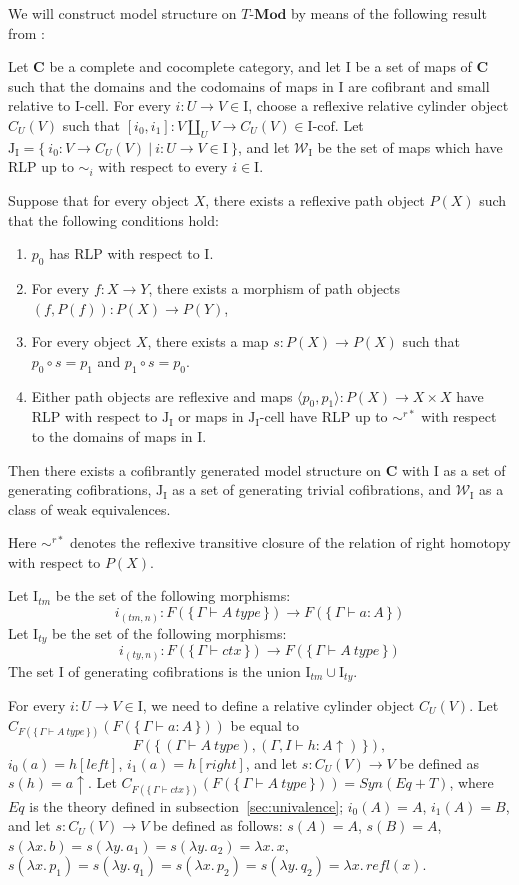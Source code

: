\documentclass[reqno]{amsart}
\theoremstyle{definition}
\theoremstyle{remark}
\newcommand{\cat}[1]{\mathbf{#1}}
\newcommand{\C}{\cat{C}}
\newcommand{\Mod}[1]{#1\text{-}\cat{Mod}}
\newcommand{\we}{\mathcal{W}}
\newcommand{\I}{\mathrm{I}}
\newcommand{\J}{\mathrm{J}}
\newcommand{\class}[2]{#1\text{-}\mathrm{#2}}
\newcommand{\Icell}[1][\I]{\class{#1}{cell}}
\newcommand{\Icof}[1][\I]{\class{#1}{cof}}
\newcommand{\Jcell}[1][]{\Icell[\J#1]}
\newcommand{\cyli}{i}
\numberwithin{figure}{section}
\begin{document}
We will construct model structure on $\Mod{T}$ by means of the following result from \cite{f-model-structures}:
\begin{thm}
Let $\C$ be a complete and cocomplete category, and let $\I$ be a set of maps of $\C$
such that the domains and the codomains of maps in $\I$ are cofibrant and small relative to $\Icell$.
For every $i : U \to V \in \I$, choose a reflexive relative cylinder object $C_U(V)$
such that $[\cyli_0,\cyli_1] : V \amalg_U V \to C_U(V) \in \Icof$.
Let $\J_\I = \{\ \cyli_0 : V \to C_U(V)\ |\ i : U \to V \in \I \ \}$, and
let $\we_\I$ be the set of maps which have RLP up to $\sim_i$ with respect to every $i \in \I$.

Suppose that for every object $X$, there exists a reflexive path object $P(X)$ such that the following conditions hold:
\begin{enumerate}
\item $p_0$ has RLP with respect to $\I$.
\item For every $f : X \to Y$, there exists a morphism of path objects $(f,P(f)) : P(X) \to P(Y)$,
\item For every object $X$, there exists a map $s : P(X) \to P(X)$ such that $p_0 \circ s = p_1$ and $p_1 \circ s = p_0$.
\item Either path objects are reflexive and maps $\langle p_0, p_1 \rangle : P(X) \to X \times X$ have RLP with respect to $\J_\I$
or maps in $\Jcell[_\I]$ have RLP up to $\sim^{r*}$ with respect to the domains of maps in $\I$.
\end{enumerate}
Then there exists a cofibrantly generated model structure on $\C$ with $\I$ as a set of generating cofibrations,
$\J_\I$ as a set of generating trivial cofibrations, and $\we_\I$ as a class of weak equivalences.
\end{thm}
Here $\sim^{r*}$ denotes the reflexive transitive closure of the relation of right homotopy with respect to $P(X)$.

Let $\I_{tm}$ be the set of the following morphisms:
\[ i_{(tm,n)} : F(\{\,\Gamma \vdash A\ type\,\}) \to F(\{\,\Gamma \vdash a : A\,\}) \]
Let $\I_{ty}$ be the set of the following morphisms:
\[ i_{(ty,n)} : F(\{\,\Gamma \vdash ctx\,\}) \to F(\{\,\Gamma \vdash A\ type\,\}) \]
The set $\I$ of generating cofibrations is the union $\I_{tm} \cup \I_{ty}$.

For every $i : U \to V \in \I$, we need to define a relative cylinder object $C_U(V)$.
Let $C_{F(\{\,\Gamma \vdash A\ type\,\})}(F(\{\,\Gamma \vdash a : A\,\}))$ be equal to
\[ F(\{\,(\Gamma \vdash A\ type), (\Gamma, I \vdash h : A\!\uparrow)\,\}), \]
$\cyli_0(a) = h[left]$, $\cyli_1(a) = h[right]$, and let $s : C_U(V) \to V$ be defined as $s(h) = a\!\uparrow$.
Let $C_{F(\{\,\Gamma \vdash ctx\,\})}(F(\{\,\Gamma \vdash A\ type\,\})) = Syn(Eq + T)$, where $Eq$ is the theory defined in subsection~\ref{sec:univalence};
$\cyli_0(A) = A$, $\cyli_1(A) = B$, and let $s : C_U(V) \to V$ be defined as follows:
$s(A) = A$, $s(B) = A$, $s(\lambda x.\,b) = s(\lambda y.\,a_1) = s(\lambda y.\,a_2) = \lambda x.\,x$,
$s(\lambda x.\,p_1) = s(\lambda y.\,q_1) = s(\lambda x.\,p_2) = s(\lambda y.\,q_2) = \lambda x.\,refl(x)$.
\end{document}
